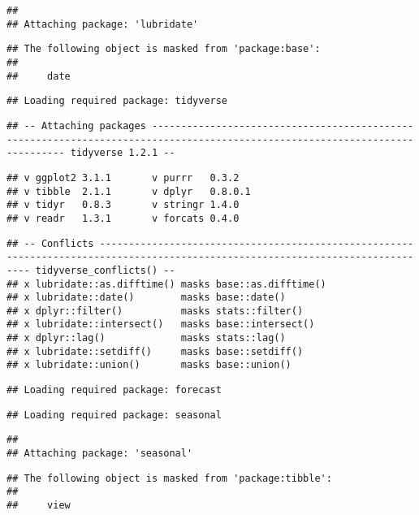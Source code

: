\documentclass[]{article}
\begin{document}
\begin{verbatim}
## 
## Attaching package: 'lubridate'
\end{verbatim}

\begin{verbatim}
## The following object is masked from 'package:base':
## 
##     date
\end{verbatim}

\begin{verbatim}
## Loading required package: tidyverse
\end{verbatim}

\begin{verbatim}
## -- Attaching packages ----------------------------------------------------------------------------------------------------------------------------- tidyverse 1.2.1 --
\end{verbatim}

\begin{verbatim}
## v ggplot2 3.1.1       v purrr   0.3.2  
## v tibble  2.1.1       v dplyr   0.8.0.1
## v tidyr   0.8.3       v stringr 1.4.0  
## v readr   1.3.1       v forcats 0.4.0
\end{verbatim}

\begin{verbatim}
## -- Conflicts -------------------------------------------------------------------------------------------------------------------------------- tidyverse_conflicts() --
## x lubridate::as.difftime() masks base::as.difftime()
## x lubridate::date()        masks base::date()
## x dplyr::filter()          masks stats::filter()
## x lubridate::intersect()   masks base::intersect()
## x dplyr::lag()             masks stats::lag()
## x lubridate::setdiff()     masks base::setdiff()
## x lubridate::union()       masks base::union()
\end{verbatim}

\begin{verbatim}
## Loading required package: forecast
\end{verbatim}

\begin{verbatim}
## Loading required package: seasonal
\end{verbatim}

\begin{verbatim}
## 
## Attaching package: 'seasonal'
\end{verbatim}

\begin{verbatim}
## The following object is masked from 'package:tibble':
## 
##     view
\end{verbatim}
\end{document}
